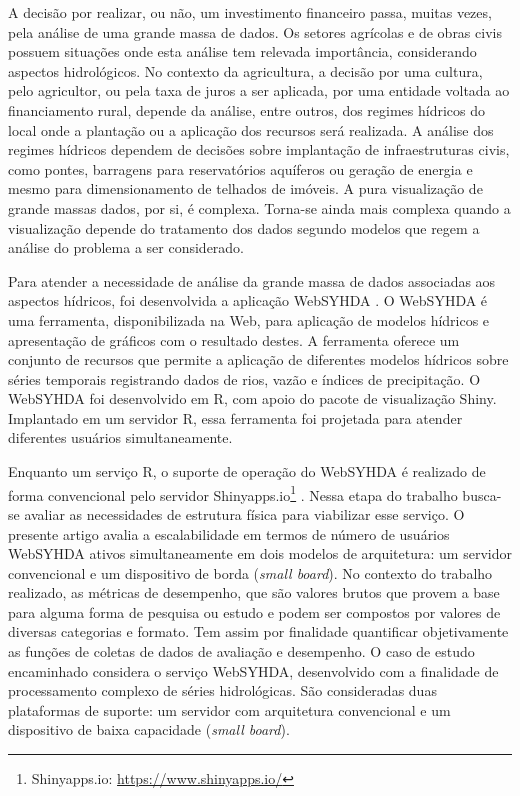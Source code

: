 \documentclass[12pt,english,brazil]{article}
\begin{document}
A  decisão por realizar, ou não, um investimento financeiro passa, muitas vezes, pela análise de uma grande
massa de dados. Os setores agrícolas e de obras civis possuem situações onde esta análise tem relevada importância, considerando aspectos hidrológicos. No contexto da agricultura, a decisão
por uma cultura, pelo agricultor, ou pela taxa de juros a ser aplicada, por uma entidade voltada ao
financiamento rural, depende da análise, entre outros, dos regimes hídricos do local onde a plantação ou
a aplicação dos recursos será realizada. A análise dos regimes hídricos dependem de decisões sobre implantação de infraestruturas civis, como pontes, barragens para reservatórios aquíferos
ou geração de energia e mesmo para dimensionamento de telhados de imóveis. A pura visualização de grande massas dados, por si, é complexa. Torna-se ainda mais complexa quando a visualização depende do tratamento dos dados segundo modelos que regem a análise do problema a ser considerado.

Para atender a necessidade de análise da grande massa de dados associadas aos aspectos hídricos, foi desenvolvida a aplicação WebSYHDA \cite{syhda}. O WebSYHDA é uma ferramenta, disponibilizada na Web, para aplicação de modelos hídricos e apresentação de gráficos com o resultado destes. A
ferramenta oferece um conjunto de recursos que permite a aplicação de diferentes modelos hídricos sobre
séries temporais registrando dados de rios, vazão e índices de precipitação. O WebSYHDA
foi desenvolvido em R, com apoio do pacote de visualização Shiny. Implantado em um servidor R, essa
ferramenta foi projetada para atender diferentes usuários simultaneamente.

Enquanto um serviço R, o suporte de operação do WebSYHDA é realizado de forma convencional pelo servidor Shinyapps.io\footnote{Shinyapps.io: \url{https://www.shinyapps.io/}} . Nessa etapa do trabalho busca-se avaliar as necessidades de
estrutura física para viabilizar esse serviço. O presente artigo avalia a escalabilidade em termos de número
de usuários WebSYHDA ativos simultaneamente em dois modelos de arquitetura: um servidor convencional
e um dispositivo de borda (\emph{small board}). 
No contexto do trabalho realizado, as métricas de desempenho, que são valores brutos que provem a base para alguma forma de pesquisa ou estudo e podem ser compostos por valores de diversas categorias e formato. Tem assim por finalidade quantificar objetivamente as funções de coletas de dados de avaliação e desempenho.
O caso de estudo encaminhado considera o serviço WebSYHDA, desenvolvido com a finalidade de processamento complexo de séries hidrológicas. São consideradas duas plataformas de suporte: um servidor com arquitetura convencional e um dispositivo de baixa capacidade (\emph{small board}). 
\end{document}
